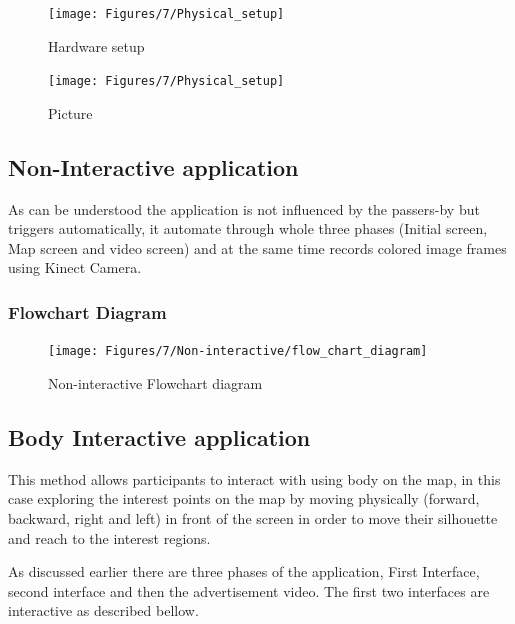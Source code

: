 \begin{figure}[H]
    \centering
    \texttt{[image: Figures/7/Physical\_setup]}
    \caption{Hardware setup}%
    \label{fig:hardwaresetup}%
\end{figure}



\begin{figure}[H]
    \centering
    \texttt{[image: Figures/7/Physical\_setup]}
    \caption{Picture}%
    \label{fig:hardwaresetup}%
\end{figure}



\subsection{Non-Interactive application}
As can be understood the application is not influenced by the passers-by but triggers automatically, it automate through whole three phases (Initial screen, Map screen and video screen) and at the same time records colored image frames using Kinect Camera.


\subsubsection{Flowchart Diagram}

\begin{figure}[H]
    \centering
    \texttt{[image: Figures/7/Non-interactive/flow\_chart\_diagram]}
    \caption{Non-interactive Flowchart diagram}%
    \label{fig:non_inter_flowchart}%
\end{figure}

\newpage
\subsection{Body Interactive application}
This method allows participants to interact with using body on the map, in this case exploring the interest points on the map by moving physically (forward, backward, right and left) in front of the screen in order to move their silhouette and reach to the interest regions.

As discussed earlier there are three phases of the application, First Interface, second interface and then the advertisement video. The first two interfaces are interactive as described bellow.

